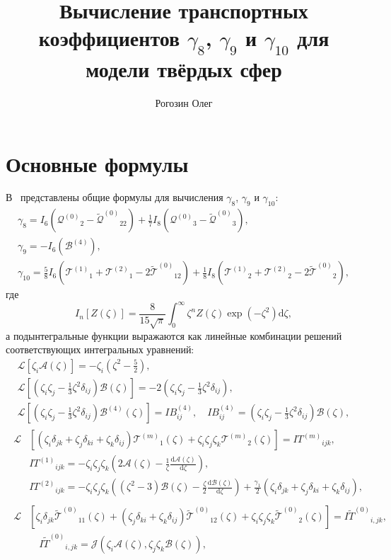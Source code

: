 \documentclass[a4paper,12pt]{article}
\title{Вычисление транспортных коэффициентов \(\gamma_8\), \(\gamma_9\) и \(\gamma_{10}\) для модели твёрдых сфер}
\author{Рогозин Олег}
\newcommand{\dd}{\mathrm{d}}
\newcommand{\der}[2][]{\frac{\dd#1}{\dd#2}}
\newcommand{\B}{\ensuremath{\mathcal{B}^{(4)}}}
\newcommand{\Q}{\ensuremath{\mathcal{Q}^{(0)}}}
\newcommand{\T}[1]{\ensuremath{\mathcal{T}^{(#1)}}}
\newcommand{\TT}{\ensuremath{\tilde{\mathcal{T}}^{(0)}}}
\newcommand{\QQ}{\ensuremath{\tilde{\mathcal{Q}}^{(0)}}}
\newcommand{\IF}[2][0]{\ensuremath{I{#2}^{(#1)}}}
\newcommand{\IFF}[1]{\ensuremath{I\tilde{#1}^{(0)}}}
\newcommand{\ZD}[2]{\zeta_{#1}\delta_{#2}}
\newcommand{\ZZZ}{\zeta_i\zeta_j\zeta_k}
\begin{document}
\maketitle
\tableofcontents

\section{Основные формулы}

В~\cite{Sone2000, Sone2002} представлены общие формулы для вычисления \(\gamma_8\), \(\gamma_9\) и \(\gamma_{10}\):
\begin{gather}
    \gamma_8 = I_6\left(\Q_2 - \QQ_{22}\right) + \frac17 I_8\left(\Q_3 - \QQ_3\right), \label{eq:gamma_8}\\
    \gamma_9 = -I_6\left(\B\right), \label{eq:gamma_9}\\
    \gamma_{10} = \frac58 I_6\left(\T{1}_1 + \T{2}_1 - 2\TT_{12}\right)
        + \frac18 I_8\left(\T{1}_2 + \T{2}_2 - 2\TT_2\right), \label{eq:gamma_10}
\end{gather}
где
\begin{equation}\label{eq:I_n}
    I_n[Z(\zeta)] = \frac{8}{15\sqrt\pi} \int_0^\infty \zeta^n Z(\zeta) \exp(-\zeta^2) \dd\zeta,
\end{equation}
а подынтегральные функции выражаются как линейные комбинации решений соответствующих интегральных уравнений:
\begin{gather}
    \mathcal{L}\left[\zeta_i\mathcal{A}(\zeta)\right] = -\zeta_i\left(\zeta^2-\frac52\right), \label{eq:A}\\[6pt]
    \mathcal{L}\left[\left(\zeta_i\zeta_j-\frac13\zeta^2\delta_{ij}\right)\mathcal{B}(\zeta)\right] =
        -2\left(\zeta_i\zeta_j-\frac13\zeta^2\delta_{ij}\right), \label{eq:B}\\[6pt]
    \mathcal{L}\left[\left(\zeta_i\zeta_j-\frac13\zeta^2\delta_{ij}\right)\B(\zeta)\right] = IB^{(4)}_{ij}, \quad
        IB^{(4)}_{ij} = \left(\zeta_i\zeta_j-\frac13\zeta^2\delta_{ij}\right)\mathcal{B}(\zeta), \label{eq:B_4}
\end{gather}
\begin{gather}
    \begin{aligned}
    \mathcal{L}&\left[(\ZD{i}{jk}+\ZD{j}{ki}+\ZD{k}{ij})\T{m}_1(\zeta) + \ZZZ\T{m}_2(\zeta)\right] = \IF[m]{T}_{ijk}, \\
        & \IF[1]{T}_{ijk} = -\ZZZ\left( 2\mathcal{A}(\zeta) - \frac1\zeta \der[\mathcal{A}(\zeta)]{\zeta} \right), \\
        & \IF[2]{T}_{ijk} = -\ZZZ\left( (\zeta^2-3)\mathcal{B}(\zeta) - \frac\zeta2 \der[\mathcal{B}(\zeta)]{\zeta} \right)
        + \frac{\gamma_1}{2} (\ZD{i}{jk}+\ZD{j}{ki}+\ZD{k}{ij}),
    \end{aligned}\label{eq:T}\\
    \begin{aligned}
    \mathcal{L}&\left[\ZD{i}{jk}\TT_{11}(\zeta)+(\ZD{j}{ki}+\ZD{k}{ij})\TT_{12}(\zeta) + \ZZZ\TT_2(\zeta)\right]
        = \IFF{T}_{i,jk}, \\
        &\quad \IFF{T}_{i,jk} = \mathcal{J}(\zeta_i\mathcal{A}(\zeta), \zeta_j\zeta_k\mathcal{B}(\zeta)),
    \end{aligned}\label{eq:TT}
\end{gather}
\end{document}
